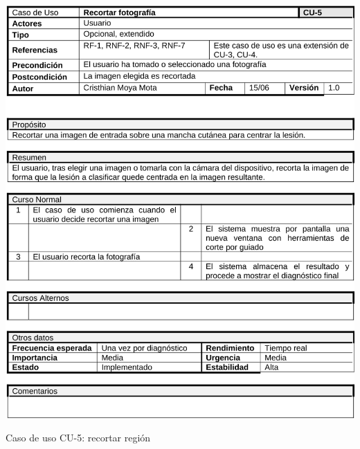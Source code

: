   \begin{table}[H]
	\centering
	\includegraphics[scale=0.45]{imagenes/cu-5.png}
	\caption{Caso de uso CU-5: recortar región}
	\label{fig:cu5}
\end{table}

